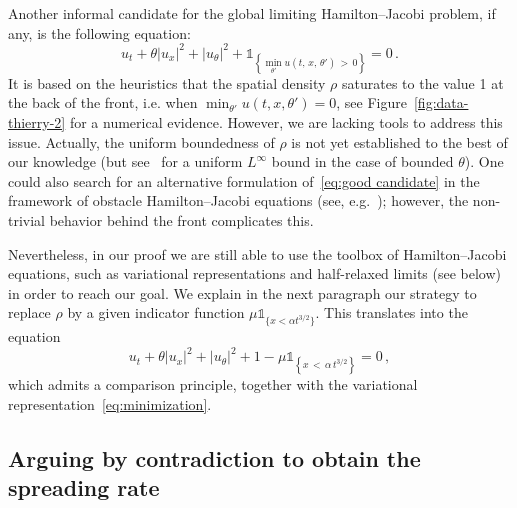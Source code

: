 \documentclass[AHL,Unicode,longabstracts]{cedram}
\newcommand{\1}{\mathds{1}}
\begin{document}
Another informal candidate for the global limiting Hamilton--Jacobi problem, if any, is the following equation:
\begin{equation}\label{eq:good candidate}
u_t+ \theta| u_{x}|^2+|u_{\theta}|^2+\1_{\left\{\min_{\theta'} u\left(t,\,x,\,\theta'\right)\,>\,0\right\}} = 0\,.
\end{equation}
It is based on the heuristics that the spatial density $\rho$ saturates to the value 1 at the back of the front, i.e. when $\min_{\theta'} u(t,x,\theta')=0$, see Figure~\ref{fig:data-thierry-2} for a numerical evidence. However, we are lacking tools to address this issue. Actually, the uniform boundedness of $\rho$ is not yet established to the best of our knowledge (but see~\cite{Turanova} for a uniform $L^\infty$ bound in the case of bounded $\theta$). One could also search for an alternative formulation of~\eqref{eq:good candidate} in the framework of obstacle Hamilton--Jacobi equations (see, e.g.~\cite{bouin_large_2016,EvansSouganidis}); however, the non-trivial behavior behind the front complicates this.



Nevertheless, in our proof we are still able to use the toolbox of Hamilton--Jacobi equations, such as variational representations and half-relaxed limits (see below) \cite{barles_discontinuous_1987} in order to reach our goal. We explain in the next paragraph our strategy to replace $\rho$ by a given indicator function $\mu \1_{\{ x < \alpha t^{3/2}\}}$. This translates into the equation
\[
u_t+ \theta| u_{x}|^2+|u_{\theta}|^2+1 - \mu \1_{\left\{x\,<\,\alpha\,t^{3/2}\right\}} = 0\,,
\]
which admits a comparison principle, together with the variational representation~\eqref{eq:minimization}.



\subsection*{Arguing by contradiction to obtain the spreading rate}
\end{document}
